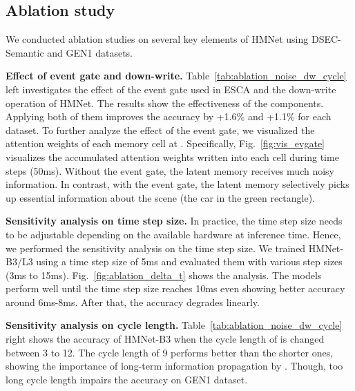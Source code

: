 \tbAblationNoiseDWCycle
\figVisEvGate
\figAblationDeltaT

\subsection{Ablation study}
\label{sec:ablation_study}
We conducted ablation studies on several key elements of HMNet using DSEC-Semantic and GEN1 datasets.

\vspace{0.1cm}
\noindent
\textbf{Effect of event gate and down-write.}
Table~\ref{tab:ablation_noise_dw_cycle} left investigates the effect of the event gate used in ESCA and the down-write operation of HMNet.
The results show the effectiveness of the components.
Applying both of them improves the accuracy by +1.6\% and +1.1\% for each dataset.
To further analyze the effect of the event gate, we visualized the attention weights of each memory cell at .
Specifically, Fig.~\ref{fig:vis_evgate} visualizes the accumulated attention weights written into each cell during  time steps (\ie 50ms).
Without the event gate, the latent memory receives much noisy information. In contrast, with the event gate, the latent memory selectively picks up essential information about the scene (\eg the car in the green rectangle).

\vspace{0.1cm}
\noindent
\textbf{Sensitivity analysis on time step size.}
In practice, the time step size needs to be adjustable depending on the available hardware at inference time.
Hence, we performed the sensitivity analysis on the time step size.
We trained HMNet-B3/L3 using a time step size of 5ms and evaluated them with various step sizes
(3ms to 15ms).
Fig.~\ref{fig:ablation_delta_t} shows the analysis.
The models perform well until the time step size reaches 10ms
even showing better accuracy around 6ms-8ms. After that, the accuracy degrades linearly.

\vspace{0.1cm}
\noindent
\textbf{Sensitivity analysis on cycle length.}
Table~\ref{tab:ablation_noise_dw_cycle} right shows the accuracy of HMNet-B3 when the cycle length of  is changed between 3 to 12.
The cycle length of 9 performs better than the shorter ones, showing the importance of long-term information propagation by .
Though, too long cycle length impairs the accuracy on GEN1 dataset.

